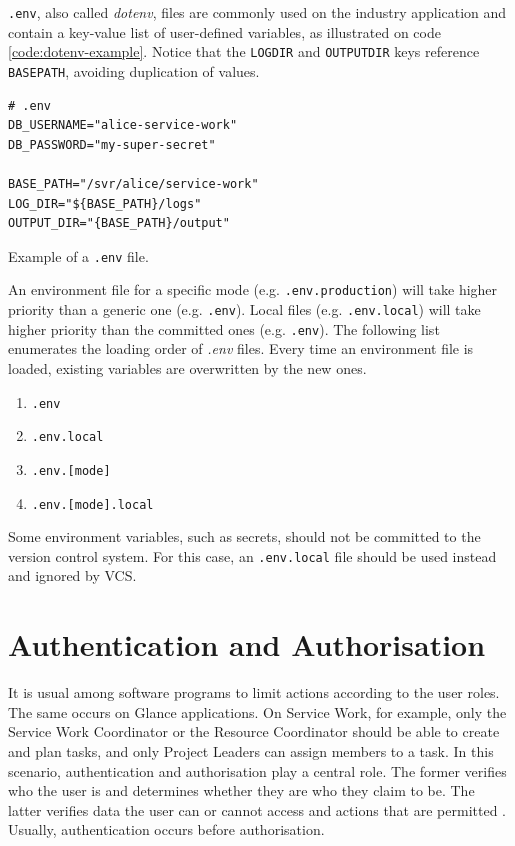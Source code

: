 \texttt{.env}, also called \textit{dotenv}, files are commonly used on the industry application and contain a key-value list of user-defined variables, as illustrated on code \autoref{code:dotenv-example}. Notice that the \texttt{LOG\textunderscore DIR} and \texttt{OUTPUT\textunderscore DIR} keys reference \texttt{BASE\textunderscore PATH}, avoiding duplication of values.

\begin{listing}[htbp]
\begin{verbatim}
# .env
DB_USERNAME="alice-service-work"
DB_PASSWORD="my-super-secret"

BASE_PATH="/svr/alice/service-work"
LOG_DIR="${BASE_PATH}/logs"
OUTPUT_DIR="{BASE_PATH}/output"
\end{verbatim}
\caption{Example of a \texttt{.env} file.}
\label{code:dotenv-example}
\end{listing}

An environment file for a specific mode (e.g. \texttt{.env.production}) will take higher priority than a generic one (e.g. \texttt{.env}). Local files (e.g. \texttt{.env.local}) will take higher priority than the committed ones (e.g. \texttt{.env}). The following list enumerates the loading order of \textit{.env} files. Every time an environment file is loaded, existing variables are overwritten by the new ones.

\begin{enumerate}
    \item \texttt{.env}
    \item \texttt{.env.local}
    \item \texttt{.env.[mode]}
    \item \texttt{.env.[mode].local}
\end{enumerate}

Some environment variables, such as secrets, should not be committed to the version control system. For this case, an \texttt{.env.local} file should be used instead and ignored by VCS.

\section{Authentication and Authorisation}
\label{sec:frapi-v1-auth}

It is usual among software programs to limit actions according to the user roles. The same occurs on Glance applications. On Service Work, for example, only the Service Work Coordinator or the Resource Coordinator should be able to create and plan tasks, and only Project Leaders can assign members to a task. In this scenario, authentication and authorisation play a central role. The former verifies who the user is and determines whether they are who they claim to be. The latter verifies data the user can or cannot access and actions that are permitted \cite{auth0-authentication-authorization}. Usually, authentication occurs before authorisation.

